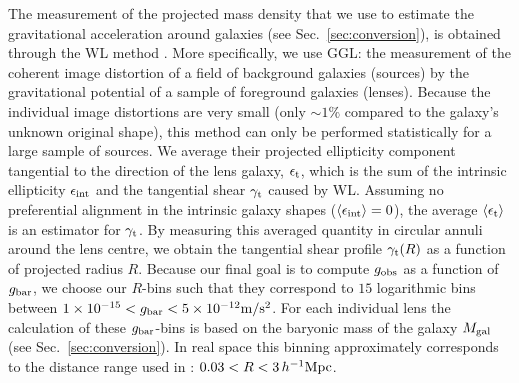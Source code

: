 \documentclass[usenatbib]{mnras}
\newcommand{\hMpc}{\, h^{-1}{\rm{Mpc}} }
\newcommand{\mpss}{ {\rm m/s^2} }
\newcommand{\lan}{\langle}
\newcommand{\ran}{\rangle}
\newcommand*{\E}[1]{\times 10^{#1}}
\newcommand{\un}[1]{_{\rm #1}}
\begin{document}
The measurement of the projected mass density that we use to estimate the gravitational acceleration around galaxies (see Sec.~\ref{sec:conversion}), is obtained through the WL method \cite[for a general introduction, see][]{bartelmann2001,schneider2006}. More specifically, we use GGL: the measurement of the coherent image distortion of a field of background galaxies (sources) by the gravitational potential of a sample of foreground galaxies (lenses). Because the individual image distortions are very small (only $\sim1\%$ compared to the galaxy's unknown original shape), this method can only be performed statistically for a large sample of sources. We average their projected ellipticity component tangential to the direction of the lens galaxy, $\epsilon\un{t}$, which is the sum of the intrinsic ellipticity $\epsilon\un{int}$ and the tangential shear $\gamma\un{t}$ caused by WL. Assuming no preferential alignment in the intrinsic galaxy shapes ($\lan\epsilon\un{int}\ran=0$), the average $\lan\epsilon\un{t}\ran$ is an estimator for $\gamma\un{t}$. By measuring this averaged quantity in circular annuli around the lens centre, we obtain the tangential shear profile $\gamma\un{t}(R)$ as a function of projected radius $R$. Because our final goal is to compute $g\un{obs}$ as a function of $g\un{bar}$, we choose our $R$-bins such that they correspond to $15$ logarithmic bins between $1\E{-15} < g\un{bar} < 5\E{-12} \mpss$. For each individual lens the calculation of these $g\un{bar}$-bins is based on the baryonic mass of the galaxy $M\un{gal}$ (see Sec.~\ref{sec:conversion}). In real space this binning approximately corresponds to the distance range used in \cite{brouwer2017}: $0.03 < R < 3 \hMpc$.
\end{document}
